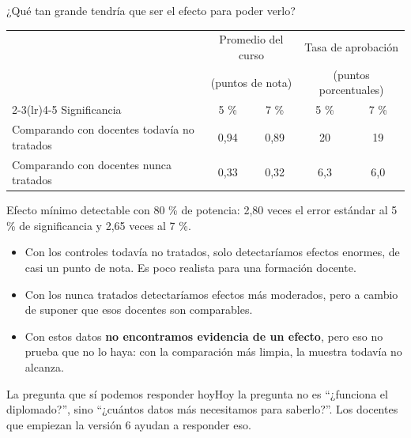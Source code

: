 \documentclass[10pt,aspectratio=169]{beamer}
\newcommand{\sintesis}[2]{%
  \begin{block}{#1}#2\end{block}}
\begin{document}
\begin{frame}{¿Qué tan grande tendría que ser el efecto para poder verlo?}
  \begin{table}\small
    \begin{tabular}{lcccc}
      \toprule
      & \multicolumn{2}{c}{Promedio del curso} & \multicolumn{2}{c}{Tasa de aprobación} \\
      & \multicolumn{2}{c}{(puntos de nota)} & \multicolumn{2}{c}{(puntos porcentuales)} \\
      \cmidrule(lr){2-3}\cmidrule(lr){4-5}
      Significancia & 5 \% & 7 \% & 5 \% & 7 \% \\
      \midrule
      Comparando con docentes todavía no tratados & 0,94 & 0,89 & 20 & 19 \\
      Comparando con docentes nunca tratados & 0,33 & 0,32 & 6,3 & 6,0 \\
      \bottomrule
    \end{tabular}
  \end{table}
  {\scriptsize Efecto mínimo detectable con 80 \% de potencia: 2,80 veces el error estándar al 5 \% de significancia y 2,65 veces al 7 \%.}
  \vspace{0.5em}
  \begin{itemize}
    \item Con los controles todavía no tratados, solo detectaríamos efectos enormes, de casi un punto de nota. Es poco realista para una formación docente.
    \item Con los nunca tratados detectaríamos efectos más moderados, pero a cambio de suponer que esos docentes son comparables.
    \item Con estos datos \textbf{no encontramos evidencia de un efecto}, pero eso no prueba que no lo haya: con la comparación más limpia, la muestra todavía no alcanza.
  \end{itemize}
  \sintesis{La pregunta que sí podemos responder hoy}{Hoy la pregunta no es ``¿funciona el diplomado?'', sino ``¿cuántos datos más necesitamos para saberlo?''. Los docentes que empiezan la versión 6 ayudan a responder eso.}
\end{frame}
\end{document}
